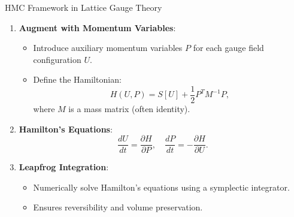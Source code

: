 \documentclass{beamer}
\begin{document}
\begin{frame}{HMC Framework in Lattice Gauge Theory}
  \begin{enumerate}
      \item \textbf{Augment with Momentum Variables}:
      \begin{itemize}
          \item Introduce auxiliary momentum variables \(P\) for each gauge field configuration \(U\).
          \item Define the Hamiltonian:
          \[
          H(U, P) = S[U] + \frac{1}{2} P^T M^{-1} P,
          \]
          where \(M\) is a mass matrix (often identity).
      \end{itemize}
      \item \textbf{Hamilton's Equations}:
      \[
      \frac{dU}{dt} = \frac{\partial H}{\partial P}, \quad \frac{dP}{dt} = -\frac{\partial H}{\partial U}.
      \]
      \item \textbf{Leapfrog Integration}:
      \begin{itemize}
          \item Numerically solve Hamilton's equations using a symplectic integrator.
          \item Ensures reversibility and volume preservation.
      \end{itemize}
  \end{enumerate}
\end{frame}
\end{document}
